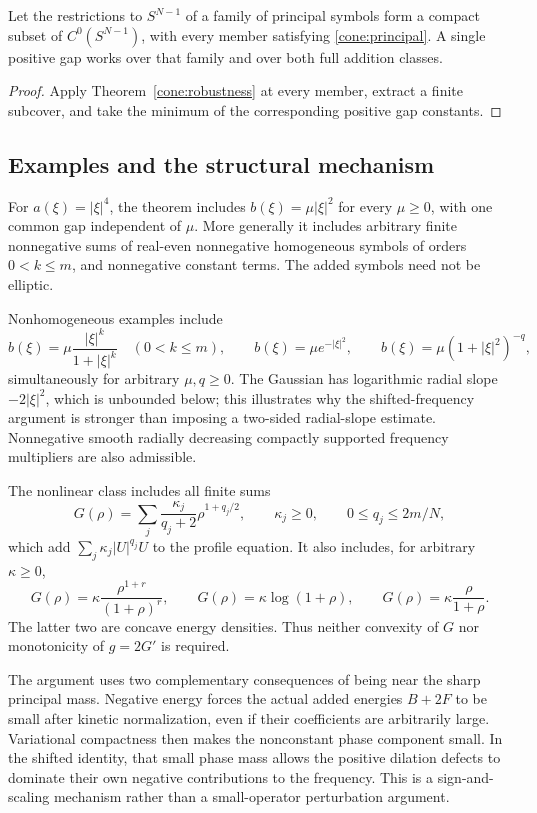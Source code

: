 \begin{proposition}\label{cone:compact-family}
Let the restrictions to \(S^{N-1}\) of a family of principal
symbols form a compact subset of \(C^0(S^{N-1})\), with every
member satisfying \eqref{cone:principal}. A single positive gap
works over that family and over both full addition classes.
\end{proposition}
\begin{proof}
Apply Theorem~\ref{cone:robustness} at every member, extract
a finite subcover, and take the minimum of the corresponding
positive gap constants.
\end{proof}

\subsection{Examples and the structural mechanism}

For \(a(\xi)=|\xi|^4\), the theorem includes
\(b(\xi)=\mu|\xi|^2\) for every \(\mu\ge0\), with one common
gap independent of \(\mu\). More generally it includes arbitrary
finite nonnegative sums of real-even nonnegative homogeneous
symbols of orders \(0<k\le m\), and nonnegative constant terms.
The added symbols need not be elliptic.

Nonhomogeneous examples include
\[
b(\xi)=\mu\frac{|\xi|^k}{1+|\xi|^k}\quad(0<k\le m),\qquad
b(\xi)=\mu e^{-|\xi|^2},\qquad
b(\xi)=\mu(1+|\xi|^2)^{-q},
\]
simultaneously for arbitrary \(\mu,q\ge0\). The Gaussian has
logarithmic radial slope \(-2|\xi|^2\), which is unbounded below;
this illustrates why the shifted-frequency argument is stronger
than imposing a two-sided radial-slope estimate.
Nonnegative smooth radially decreasing compactly supported
frequency multipliers are also admissible.

The nonlinear class includes all finite sums
\[
G(\rho)=\sum_j\frac{\kappa_j}{q_j+2}\rho^{1+q_j/2},
\qquad \kappa_j\ge0,\qquad 0\le q_j\le2m/N,
\]
which add \(\sum_j\kappa_j|U|^{q_j}U\) to the profile equation.
It also includes, for arbitrary \(\kappa\ge0\),
\[
G(\rho)=\kappa\frac{\rho^{1+r}}{(1+\rho)^r},\qquad
G(\rho)=\kappa\log(1+\rho),\qquad
G(\rho)=\kappa\frac{\rho}{1+\rho}.
\]
The latter two are concave energy densities. Thus neither
convexity of \(G\) nor monotonicity of \(g=2G'\) is required.

The argument uses two complementary consequences of being near
the sharp principal mass. Negative energy forces the actual added
energies \(B+2F\) to be small after kinetic normalization, even if
their coefficients are arbitrarily large. Variational compactness
then makes the nonconstant phase component small. In the shifted
identity, that small phase mass allows the positive dilation
defects to dominate their own negative contributions to the
frequency. This is a sign-and-scaling mechanism rather than a
small-operator perturbation argument.

